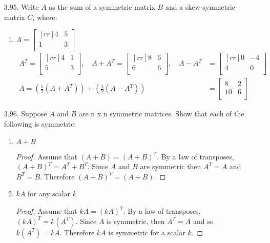 \documentclass[12pt]{article}
\begin{document}
\begin{enumerate}
\item [3.95.] Write $A$ as the sum of a symmetric matrix $B$ and a skew-symmetric matrix $C$, where:
	\begin{enumerate}
	\item $A= \begin{bmatrix}[rr] 4 & 5\\ 1 & 3\\ \end{bmatrix}$\\
	\begin{align*}
	A^T = \begin{bmatrix}[rr] 4 & 1\\ 5 & 3\\ \end{bmatrix}, \quad
	A+A^T = \begin{bmatrix}[rr] 8 & 6\\ 6 & 6\\ \end{bmatrix}, \quad
	A-A^T &= \begin{bmatrix}[rr] 0 & -4\\ 4 & 0\\ \end{bmatrix}\\
	A=(\frac{1}{2}(A+A^T)) + (\frac{1}{2}(A-A^T)) 
	&= \begin{bmatrix}8 & 2\\ 10 & 6\\ \end{bmatrix} 
	\end{align*}
	\end{enumerate}
	
	
\item [3.96.] Suppose $A$ and $B$ are n x n symmetric matrices. Show that each of the following is symmetric:
	\begin{enumerate}
	\item $A+B$
	\begin{proof}
	Assume that $(A+B)=(A+B)^T$. By a law of transposes, $(A+B)^T = A^T+B^T$. Since $A$ and $B$ are symmetric then $A^T=A$ and $B^T=B$. Therefore $(A+B)^T = (A+B)$.
	\end{proof}
	
	\item $kA$ for any scalar $k$
	\begin{proof}
	Assume that $kA=(kA)^T$. By a law of transposes, $(kA)^T = k(A^T)$. Since $A$ is symmetric, then $A^T=A$ and so $k(A^T) = kA$. Therefore $kA$ is symmetric for a scalar $k$.
	\end{proof}		
	

\end{enumerate}
\end{enumerate}
\end{document}
